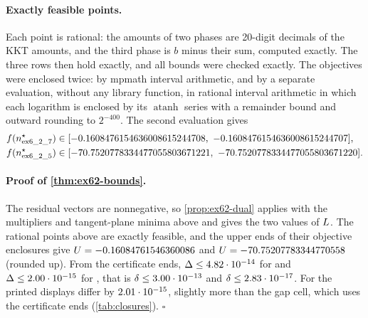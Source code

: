 \paragraph{Exactly feasible points.}
Each point is rational: the amounts of two phases are 20-digit decimals of the KKT amounts, and the third phase is $b$ minus their sum, computed exactly.
The three rows then hold exactly, and all bounds were checked exactly.
The objectives were enclosed twice:
by mpmath interval arithmetic, and by a separate evaluation, without any library function, in rational interval arithmetic in which each logarithm is enclosed by its $\operatorname{atanh}$ series with a remainder bound and outward rounding to $2^{-400}$.
The second evaluation gives
\begin{align*}
f(n^\star_{\text{\inst{ex6_2_7}}})&\in[-0.1608476154636008615244708,\ -0.1608476154636008615244707],\\
f(n^\star_{\text{\inst{ex6_2_5}}})&\in[-70.7520778334477055803671221,\ -70.7520778334477055803671220].
\end{align*}

\paragraph{Proof of \cref{thm:ex62-bounds}.}
The residual vectors are nonnegative, so \cref{prop:ex62-dual} applies with the multipliers and tangent-plane minima above and gives the two values of $L$.
The rational points above are exactly feasible, and the upper ends of their objective enclosures give
$U=-0.16084761546360086$ and $U=-70.75207783344770558$ (rounded up).
From the certificate ends, $\Delta\le4.82\cdot 10^{-14}$ for  and $\Delta\le2.00\cdot 10^{-15}$ for , that is $\delta\le3.00\cdot 10^{-13}$ and $\delta\le2.83\cdot 10^{-17}$.
For  the printed displays differ by $2.01\cdot 10^{-15}$, slightly more than the gap cell, which uses the certificate ends (\cref{tab:closures}).
\hfill$\square$

